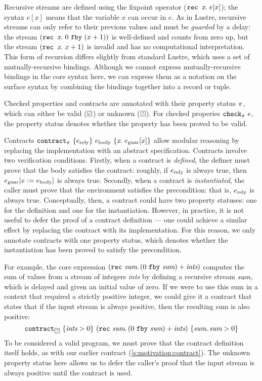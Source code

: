 Recursive streams are defined using the fixpoint operator ($\texttt{rec~} x\hspace{-0.1em}.~e[x]$); the syntax $e[x]$ means that the variable $x$ can occur in $e$.
As in Lustre, recursive streams can only refer to their previous values and must be \emph{guarded} by a delay: the stream $(\texttt{rec~} x\hspace{-0.1em}.~0~\texttt{fby}~(x + 1))$ is well-defined and counts from zero up, but the stream $(\texttt{rec~} x\hspace{-0.1em}.~x + 1)$ is invalid and has no computational interpretation.
This form of recursion differs slightly from standard Lustre, which uses a set of mutually-recursive bindings.
Although we cannot express mutually-recursive bindings in the core syntax here, we can express them as a notation on the surface syntax by combining the bindings together into a record or tuple.

Checked properties and contracts are annotated with their property status $\pi$, which can either be valid ($\PSValid$) or unknown ($\PSUnknown$).
For checked properies $\texttt{check}_{\pi}~e$, the property status denotes whether the property has been proved to be valid.

Contracts $\texttt{contract}_{\pi}~\{e_{\text{rely}}\}~e_{\text{body}}~\{x\hspace{-0.1em}.~e_{\text{guar}}[x]\}$ allow modular reasoning by replacing the implementation with an abstract specification.
Contracts involve two verification conditions.
Firstly, when a contract is \emph{defined}, the definer must prove that the body satisfies the contract: roughly, if $e_{\text{rely}}$ is always true, then $e_{\text{guar}}[x := e_{\text{body}}]$ is always true.
Secondly, when a contract is \emph{instantiated}, the caller must prove that the environment satisfies the precondition: that is, $e_{\text{rely}}$ is always true.
Conceptually, then, a contract could have two property statuses: one for the definition and one for the instantiation.
However, in practice, it is not useful to defer the proof of a contract definition --- one could achieve a similar effect by replacing the contract with its implementation.
For this reason, we only annotate contracts with one property status, which denotes whether the instantiation has been proved to satisfy the precondition.

For example, the core expression $(\texttt{rec}~\textit{sum}.\, (0~\texttt{fby}~\textit{sum}) + \textit{ints})$ computes the sum of values from a stream of integers \emph{ints} by defining a recursive stream $\textit{sum}$, which is delayed and given an initial value of zero.
If we were to use this sum in a context that required a strictly positive integer, we could give it a contract that states that if the input stream is always positive, then the resulting sum is also positive:
$$
\sumcontract
$$
To be considered a valid program, we must prove that the contract definition itself holds, as with our earlier contract (\autoref{s:motivation:contract}).
The unknown property status here allows us to defer the caller's proof that the input stream is always positive until the contract is used.


